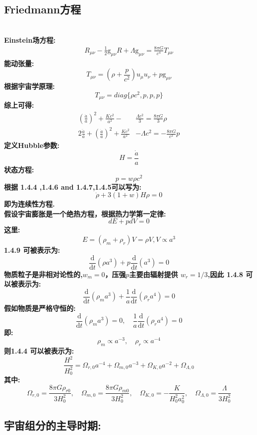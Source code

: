 \documentclass[14pt]{article}
\newcommand{\derivo}[2]{\frac{\mathrm{d} #1 }{\mathrm{d} #2}}
\newcommand{\g}{\mathrm{g}}
\begin{document}
\subsection{Friedmann方程}
\quad\\
\textbf{Einstein场方程:}
\begin{align*}
R_{\mu \nu}-\frac{1}{2}\g_{\mu \nu}R + \Lambda \g_{\mu \nu} = \frac{8\pi G}{c^{4}}T_{\mu \nu} \tag{1.4.1}
\end{align*}
\textbf{能动张量:}
\[
T_{\mu\nu}=(\rho+\frac{p}{c^{2}})u_{\mu}u_{\nu}+p\g_{\mu\nu} \tag{1.4.2}
\]
\textbf{根据宇宙学原理:}
\[
T_{\mu\nu}= diag\{\rho c^{2},p,p,p\} \tag{1.4.3}
\]
\textbf{综上可得:}
\begin{align*}
    (\frac{\dot{a}}{a})^{2}+\frac{Kc^{2}}{a^{2}}-&\frac{\Lambda c^{2}}{3}=\frac{8\pi G}{3}\rho\tag{1.4.4}\\
    2\frac{\ddot{a}}{a}+(\frac{\dot{a}}{a})^{2}+\frac{Kc^{2}}{a^{2}}&-\Lambda c^{2}=-\frac{8\pi G}{c^{2}}p \tag{1.4.5}
\end{align*}
\textbf{定义Hubble参数:}
\[
H = \frac{\dot{a}}{a}\tag{1.4.6}
\]
\textbf{状态方程:}
\[
p=w\rho c^{2} \tag{1.4.7}
\]
\textbf{根据 1.4.4 ,1.4.6 and 1.4.7,1.4.5可以写为:}
\[
\dot{\rho}+3(1+w)H\rho=0 \tag{1.4.8}
\]
\textbf{即为连续性方程.}\\
\textbf{假设宇宙膨胀是一个绝热方程，根据热力学第一定律:}
\[
dE+pdV=0 \tag{1.4.9}
\]
\textbf{这里:}
\[
E=(\rho_{m}+\rho_{r})V=\rho V,V \propto a^{3}\tag{1.4.10}
\]
\textbf{1.4.9 可被表示为:}
\[
\derivo{}{t}(\rho a^{3})+p\derivo{}{t}(a^{3})=0\tag{1.4.11}
\]
\textbf{物质粒子是非相对论性的,\(w_{m}=0\)，压强$p$主要由辐射提供 \(w_{r}=1/3\),因此 1.4.8 可以被表示为:}\citep{CLSS1}
\[
\derivo{}{t}(\rho_{m} a^{3})+\frac{1}{a}\derivo{}{t}(\rho_{r}a^{4})=0\tag{1.4.12}
\]
\textbf{假如物质是严格守恒的:}
\[
\derivo{}{t}(\rho_{m} a^{3})=0,\quad \frac{1}{a}\derivo{}{t}(\rho_{r}a^{4})=0\tag{1.4.13}
\]
\textbf{即:}
\[
\rho_{m} \propto a^{-3},\quad \rho_{r} \propto a^{-4}\tag{1.4.14}
\]
\textbf{则1.4.4 可以被表示为:}
\[
\frac{H^{2}}{H^{2}_{0}} = \Omega_{r,0}a^{-4}+\Omega_{m,0}a^{-3}+\Omega_{K,0}a^{-2}+\Omega_{\Lambda,0}\tag{1.4.15}
\]
\textbf{其中:}
\[
\Omega_{r,0}=\frac{8\pi G\rho_{r0}}{3H^{2}_{0}},\quad \Omega_{m,0}=\frac{8\pi G\rho_{m0}}{3H^{2}_{0}},\quad \Omega_{K,0}=-\frac{K}{H^{2}_{0}a^{2}_{0}},\quad \Omega_{\Lambda,0}=\frac{\Lambda}{3H^{2}_{0}}\tag{1.4.16}
\]
\subsection{宇宙组分的主导时期:}
\end{document}
